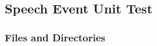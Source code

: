 \documentclass{CSSRforAfrica}
\begin{document}

  
%  
%

 
\subsection{Speech Event Unit Test} 
\label{subsection:speech_event_test}


\subsubsection{Files and Directories}
 
\end{document}
